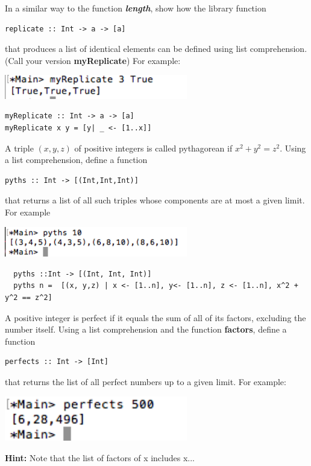 \documentclass{article}
\begin{document}
\begin{Exercise}
In a similar way to the function \textbf{\textit{length}}, show how the library function 
\begin{lstlisting}
replicate :: Int -> a -> [a]
\end{lstlisting}
that produces a list of identical elements can be defined using list comprehension. (Call your version \textbf{myReplicate}) 
For example: 
 \begin{center}
	\includegraphics[width=8cm]{img/03.png}
\end{center} 
\end{Exercise}
\begin{Answer}
\begin{lstlisting}
myReplicate :: Int -> a -> [a]
myReplicate x y = [y| _ <- [1..x]]
\end{lstlisting}
\end{Answer}
\pagebreak
\begin{Exercise}
A triple $(x,y,z)$ of positive integers is called pythagorean if $x^2 + y^2 = z^2$.  Using a list comprehension, define a function
\begin{lstlisting}
pyths :: Int -> [(Int,Int,Int)]
\end{lstlisting}
that returns a list of all such triples whose components are at most a given limit. For example
\begin{center}
	\includegraphics[width=8cm]{img/04.png}
\end{center}
\end{Exercise}
\begin{Answer}
\begin{lstlisting}
  pyths ::Int -> [(Int, Int, Int)]
  pyths n =  [(x, y,z) | x <- [1..n], y<- [1..n], z <- [1..n], x^2 + y^2 == z^2]
\end{lstlisting}
\end{Answer}
\begin{Exercise}
A positive integer is perfect if it equals the sum of all of its factors, excluding the number itself.  Using a list comprehension and the function \textbf{factors}, define a function
\begin{lstlisting}
perfects :: Int -> [Int]
\end{lstlisting}
that returns the list  of all perfect numbers up to a given limit. For example:
\begin{center}
	\includegraphics[width=8cm]{img/05.png}
\end{center}
\textbf{Hint: } Note that the list of factors of x includes x...
\end{Exercise}
\end{document}
